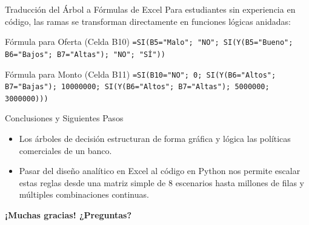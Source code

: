 \documentclass[10pt, aspectratio=169]{beamer}
\begin{document}
	\begin{frame}[fragile]{Traducción del Árbol a Fórmulas de Excel}
		Para estudiantes sin experiencia en código, las ramas se transforman directamente en funciones lógicas anidadas:
		\vspace{0.4cm}
		\begin{exampleblock}{Fórmula para Oferta (Celda B10)}
			\texttt{=SI(B5="Malo"; "NO"; SI(Y(B5="Bueno"; B6="Bajos"; B7="Altas"); "NO"; "SÍ"))}
		\end{exampleblock}
		\vspace{0.3cm}
		\begin{exampleblock}{Fórmula para Monto (Celda B11)}
			\texttt{=SI(B10="NO"; 0; SI(Y(B6="Altos"; B7="Bajas"); 10000000; SI(Y(B6="Altos"; B7="Altas"); 5000000; 3000000)))}
		\end{exampleblock}
	\end{frame}
	
	\begin{frame}{Conclusiones y Siguientes Pasos}
		\begin{itemize}
			\item Los árboles de decisión estructuran de forma gráfica y lógica las políticas comerciales de un banco.
			\item Pasar del diseño analítico en Excel al código en Python nos permite escalar estas reglas desde una matriz simple de 8 escenarios hasta millones de filas y múltiples combinaciones continuas.
		\end{itemize}
		\vspace{0.5cm}
		\centering
		\textbf{¡Muchas gracias! ¿Preguntas?}
	\end{frame}
	
\end{document}
